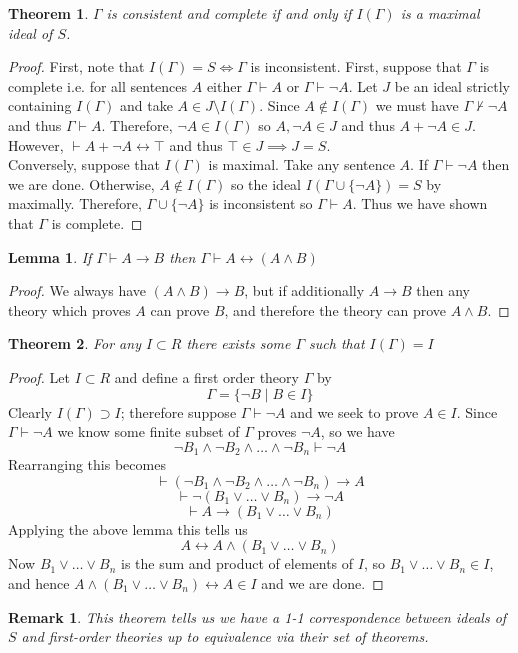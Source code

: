 \documentclass{article}
\newcommand{\lra}{\leftrightarrow}
\newcommand{\proves}{\vdash}
\newtheorem{lemma}{Lemma}
\newtheorem{thm}{Theorem}
\theoremstyle{plain}
\newtheorem{rmk}{Remark}
\begin{document}
\begin{thm}
$\Gamma$ is consistent and complete if and only if 
$I(\Gamma)$ is a maximal ideal of $S$.
\end{thm}
\begin{proof}
First, note that $I(\Gamma) = S \iff \Gamma$ is inconsistent. First, suppose that $\Gamma$ is complete i.e. for all sentences $A$ either $\Gamma \proves A$ or $\Gamma \proves \neg A$. Let $J$ be an ideal strictly containing $I(\Gamma)$ and take $A \in J \setminus I(\Gamma)$. Since $A \notin I(\Gamma)$ we must have $\Gamma \not\proves \neg A$ and thus $\Gamma \proves A$. Therefore, $\neg A \in I(\Gamma)$ so $A, \neg A \in J$ and thus $A + \neg A \in J$. However, $\proves A + \neg A \lra \top$ and thus $\top \in J \implies J = S$.
\bigskip\\
Conversely, suppose that $I(\Gamma)$ is maximal. Take any sentence $A$. If $\Gamma \proves \neg A$ then we are done. Otherwise, $A \notin I(\Gamma)$ so the ideal $I(\Gamma \cup \{\neg A \}) = S$ by maximally. Therefore, $\Gamma \cup \{\neg A \}$ is inconsistent so $\Gamma \proves A$. Thus we have shown that $\Gamma$ is complete. 
\end{proof}

\begin{lemma}
If $\Gamma \proves A \to B$ then $\Gamma \proves A \lra (A \land B)$
\end{lemma}

\begin{proof}
We always have $(A \land B) \to B$, but if additionally
$A \to B$ then any theory which proves $A$ can prove $B$,
and therefore the theory can prove $A \land B$.
\end{proof}
\begin{thm}
For any $I \subset R$ there exists some $\Gamma$ such
that $I(\Gamma) = I$
\end{thm}
\begin{proof}
Let $I \subset R$ and define a first order theory $\Gamma$
by
\[ \Gamma = \{ \lnot B \mid B \in I \} \]
Clearly $I(\Gamma) \supset I$; therefore suppose 
$\Gamma \vdash \lnot A$ and we seek to prove $A \in I$.
Since $\Gamma \vdash \lnot A$ we know some finite subset
of $\Gamma$ proves $\lnot A$, so we have
\[ \lnot B_1 \land \lnot B_2 \land \dots \land \lnot B_n
\vdash \lnot A \]
Rearranging this becomes
\[ \vdash 
(\lnot B_1 \land \lnot B_2 \land \dots \land \lnot B_n) \to A \]
\[ \vdash
\lnot (B_1 \lor \dots \lor B_n) \to \lnot A \]
\[ \vdash A \to (B_1 \lor \dots \lor B_n) \]
Applying the above lemma this tells us
\[ A \lra A \land (B_1 \lor \dots \lor B_n) \]
Now $B_1 \lor \dots \lor B_n$ is the sum and product of elements
of $I$, so $B_1 \lor \dots \lor B_n \in I$,
and hence $A \land (B_1 \lor \dots \lor B_n) \lra A \in I$
and we are done.
\end{proof}
\begin{rmk}
This theorem tells us we have a 1-1 correspondence
between ideals of $S$ and first-order theories up to equivalence via their set of theorems.
\end{rmk}
\end{document}
